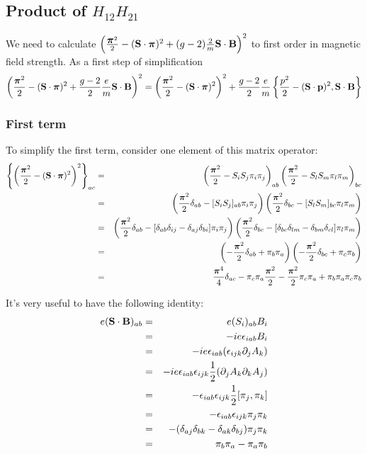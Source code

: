 \subsection*{Product of $H_{12}H_{21}$}
We need to calculate $\left(  \frac {\mbox{\boldmath$ \pi $}^2} {2} -  (\mathbf{S} \cdot \mbox{\boldmath$ \pi $})^2 + (g-2)\frac{2}{m} \mathbf{S} \cdot \mathbf{B} \right )^2 $ to first order in magnetic field strength.  As a first step of simplification
\[
\left(  \frac {\mbox{\boldmath$ \pi $}^2} {2} -  (\mathbf{S} \cdot \mbox{\boldmath$ \pi $})^2 + \frac{g-2}{2}\frac{e}{m} \mathbf{S} \cdot \mathbf{B} \right )^2 
	=	\left(  \frac {\mbox{\boldmath$ \pi $}^2} {2} -  (\mathbf{S} \cdot \mbox{\boldmath$ \pi $})^2  \right )^2 
		 +\frac{g-2}{2}\frac{e}{m} \left \{ \frac{p^2}{2} - (\mathbf{S} \cdot \mathbf{p})^2, \mathbf{S} \cdot \mathbf{B} \right \}
\]	

\subsubsection*{First term}
To simplify the first term, consider one element of this matrix operator:
\begin{eqnarray*}
\left\{ \left(  \frac {\mbox{\boldmath$ \pi $}^2} {2} -  (\mathbf{S} \cdot \mbox{\boldmath$ \pi $})^2   \right )^2  \right \} _{ac}
	&=& 	\left (  \frac {\mbox{\boldmath$ \pi $}^2} {2} - S_i S_j \pi_i \pi_j \right)_{ab} 
				\left (  \frac {\mbox{\boldmath$ \pi $}^2} {2} - S_l S_m \pi_l \pi_m \right)_{bc}\\
	&=& 	\left (  \frac {\mbox{\boldmath$ \pi $}^2} {2}\delta_{ab} - [S_i S_j]_{ab} \pi_i \pi_j \right)
				\left (  \frac {\mbox{\boldmath$ \pi $}^2} {2}\delta_{bc} - [S_l S_m]_{bc} \pi_l \pi_m \right)\\
	&=& 	\left (  \frac {\mbox{\boldmath$ \pi $}^2} {2}\delta_{ab} - [\delta_{ab}\delta_{ij} - \delta_{aj}\delta_{bi}] \pi_i \pi_j \right)
				\left (  \frac {\mbox{\boldmath$ \pi $}^2} {2}\delta_{bc} -  [\delta_{bc}\delta_{lm} - \delta_{bm}\delta_{cl}] \pi_l \pi_m \right)\\
	&=& 	\left (  -\frac {\mbox{\boldmath$ \pi $}^2} {2}\delta_{ab} + \pi_b \pi_a \right)
				\left (  -\frac {\mbox{\boldmath$ \pi $}^2} {2}\delta_{bc} + \pi_c \pi_b \right) \\
	&=&  	\frac{ \mbox{\boldmath$ \pi $}^4 } {4} \delta_{ac}
				- \pi_c \pi_a \frac{\mbox{\boldmath$ \pi $}^2}{2}
				- \frac{\mbox{\boldmath$ \pi $}^2}{2} \pi_c \pi_a
				+ \pi_b \pi_a \pi_c \pi_b \\
\end{eqnarray*}

It's very useful to have the following identity:
\begin{eqnarray*}
	e(\mathbf{S} \cdot \mathbf{B})_{ab}
	&=&	e(S_i)_{ab} B_i	\\
	&=&	-i e \epsilon_{iab} B_i 	\\
	&=&	-i e \epsilon_{iab} (\epsilon_{ijk}\partial_j A_k)	\\
	&=&	-i e \epsilon_{iab} \epsilon_{ijk} \frac{1}{2} (\partial_j A_k \partial_k A_j) \\
	&=&	- \epsilon_{iab} \epsilon_{ijk} \frac{1}{2} [\pi_j, \pi_k]	\\
	&=&	-\epsilon_{iab} \epsilon_{ijk} \pi_j \pi_k	\\
	&=&	-(\delta_{aj} \delta_{bk}	- \delta_{ak} \delta_{bj} ) \pi_j \pi_k \\
	&=&	\pi_b \pi_a - \pi_a \pi_b	\\
\end{eqnarray*}

